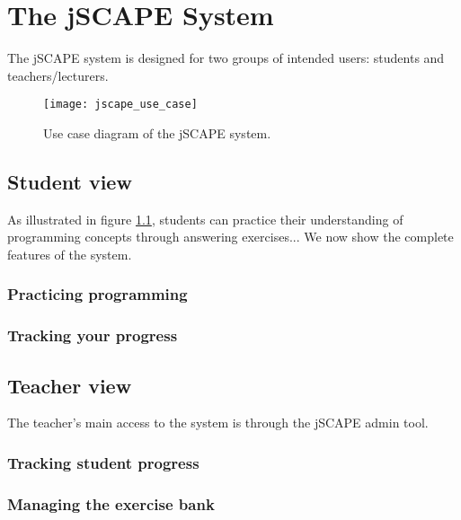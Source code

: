 \chapter{The jSCAPE System}

The jSCAPE system is designed for two groups of intended users: students and teachers/lecturers. 

\begin{figure}[H]
\centering
\texttt{[image: jscape\_use\_case]}
\caption{Use case diagram of the jSCAPE system.}
\label{fig:jscape_use_case}
\end{figure}


\section{Student view}
As illustrated in figure \ref{fig:jscape_use_case}, students can practice their understanding of programming concepts through answering exercises... We now show the complete features of the system.

\subsection{Practicing programming}

\subsection{Tracking your progress}

\section{Teacher view}
The teacher's main access to the system is through the jSCAPE admin tool. 

\subsection{Tracking student progress}

\subsection{Managing the exercise bank}

